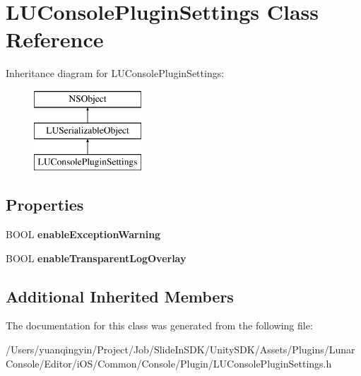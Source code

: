 \hypertarget{interface_l_u_console_plugin_settings}{}\section{L\+U\+Console\+Plugin\+Settings Class Reference}
\label{interface_l_u_console_plugin_settings}
Inheritance diagram for L\+U\+Console\+Plugin\+Settings\+:\begin{figure}[H]
\begin{center}
\leavevmode
\includegraphics[height=3.000000cm]{interface_l_u_console_plugin_settings}
\end{center}
\end{figure}
\subsection*{Properties}
\begin{DoxyCompactItemize}
\item 
\mbox{\label{interface_l_u_console_plugin_settings_ac59c987fd5c10780a6e5e93b9072a377}} 
B\+O\+OL {\bfseries enable\+Exception\+Warning}
\item 
\mbox{\label{interface_l_u_console_plugin_settings_af1fccbf408e45e6de44ff889c07969b3}} 
B\+O\+OL {\bfseries enable\+Transparent\+Log\+Overlay}
\end{DoxyCompactItemize}
\subsection*{Additional Inherited Members}


The documentation for this class was generated from the following file\+:\begin{DoxyCompactItemize}
\item 
/\+Users/yuanqingyin/\+Project/\+Job/\+Slide\+In\+S\+D\+K/\+Unity\+S\+D\+K/\+Assets/\+Plugins/\+Lunar\+Console/\+Editor/i\+O\+S/\+Common/\+Console/\+Plugin/L\+U\+Console\+Plugin\+Settings.\+h\end{DoxyCompactItemize}
